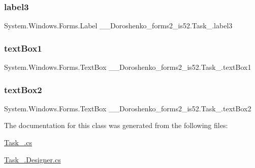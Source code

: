 \subsubsection{\texorpdfstring{label3}{label3}}
{\footnotesize\ttfamily System.\+Windows.\+Forms.\+Label \+\_\+\_\+\+Doroshenko\+\_\+forms2\+\_\+is52.\+Task\+\_.\+label3\hspace{0.3cm}{\ttfamily [private]}}

\hypertarget{class__7___doroshenko__forms2__is52_1_1_task__9_a4aa140b1ba89e675c011f4be366e21ca}{}\label{class__7___doroshenko__forms2__is52_1_1_task__9_a4aa140b1ba89e675c011f4be366e21ca} 
\subsubsection{\texorpdfstring{text\+Box1}{textBox1}}
{\footnotesize\ttfamily System.\+Windows.\+Forms.\+Text\+Box \+\_\+\_\+\+Doroshenko\+\_\+forms2\+\_\+is52.\+Task\+\_.\+text\+Box1\hspace{0.3cm}{\ttfamily [private]}}

\hypertarget{class__7___doroshenko__forms2__is52_1_1_task__9_aca272bd2f655d99aaf77424638d7cf79}{}\label{class__7___doroshenko__forms2__is52_1_1_task__9_aca272bd2f655d99aaf77424638d7cf79} 
\subsubsection{\texorpdfstring{text\+Box2}{textBox2}}
{\footnotesize\ttfamily System.\+Windows.\+Forms.\+Text\+Box \+\_\+\_\+\+Doroshenko\+\_\+forms2\+\_\+is52.\+Task\+\_.\+text\+Box2\hspace{0.3cm}{\ttfamily [private]}}



The documentation for this class was generated from the following files\+:\begin{DoxyCompactItemize}
\item 
\hyperlink{_task__9_8cs}{Task\+\_.\+cs}\item 
\hyperlink{_task__9_8_designer_8cs}{Task\+\_.\+Designer.\+cs}\end{DoxyCompactItemize}
